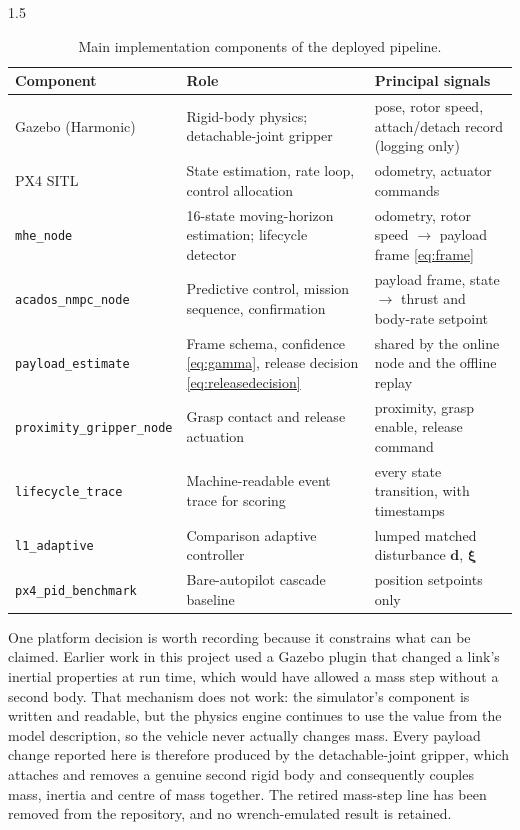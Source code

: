 \begin{spacing}{1.5}
\begin{table}[ht]
\centering
\caption{Main implementation components of the deployed pipeline.}
\label{tab:software}
\small
\begin{tabularx}{\textwidth}{@{}l X X@{}}
\toprule
\textbf{Component} & \textbf{Role} & \textbf{Principal signals} \\
\midrule
Gazebo (Harmonic) & Rigid-body physics; detachable-joint gripper &
pose, rotor speed, attach/detach record (logging only) \\
PX4 SITL & State estimation, rate loop, control allocation &
odometry, actuator commands \\
\texttt{mhe\_node} & 16-state moving-horizon estimation; lifecycle detector &
odometry, rotor speed $\rightarrow$ payload frame \eqref{eq:frame} \\
\texttt{acados\_nmpc\_node} & Predictive control, mission sequence, confirmation &
payload frame, state $\rightarrow$ thrust and body-rate setpoint \\
\texttt{payload\_estimate} & Frame schema, confidence \eqref{eq:gamma}, release decision \eqref{eq:releasedecision} &
shared by the online node and the offline replay \\
\texttt{proximity\_gripper\_node} & Grasp contact and release actuation &
proximity, grasp enable, release command \\
\texttt{lifecycle\_trace} & Machine-readable event trace for scoring &
every state transition, with timestamps \\
\texttt{l1\_adaptive} & Comparison adaptive controller &
lumped matched disturbance $\bm d$, $\bm\xi$ \\
\texttt{px4\_pid\_benchmark} & Bare-autopilot cascade baseline &
position setpoints only \\
\bottomrule
\end{tabularx}
\end{table}

One platform decision is worth recording because it constrains what can be
claimed. Earlier work in this project used a Gazebo plugin that changed a link's
inertial properties at run time, which would have allowed a mass step without a
second body. That mechanism does not work: the simulator's component is written
and readable, but the physics engine continues to use the value from the model
description, so the vehicle never actually changes mass. Every payload change
reported here is therefore produced by the detachable-joint gripper, which
attaches and removes a genuine second rigid body and consequently couples mass,
inertia and centre of mass together. The retired mass-step line has been removed
from the repository, and no wrench-emulated result is retained.


\end{spacing}
